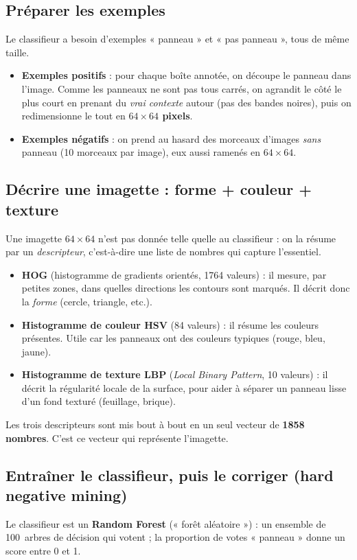 \documentclass[a4paper,10pt]{article}
\begin{document}
\subsection{Préparer les exemples}
Le classifieur a besoin d'exemples « panneau » et « pas panneau », tous de même
taille.
\begin{itemize}[noitemsep,topsep=2pt]
\item \textbf{Exemples positifs} : pour chaque boîte annotée, on découpe le panneau
dans l'image. Comme les panneaux ne sont pas tous carrés, on agrandit le côté le plus
court en prenant du \emph{vrai contexte} autour (pas des bandes noires), puis on
redimensionne le tout en \textbf{$64\times64$ pixels}.
\item \textbf{Exemples négatifs} : on prend au hasard des morceaux d'images
\emph{sans} panneau (10 morceaux par image), eux aussi ramenés en $64\times64$.
\end{itemize}

\subsection{Décrire une imagette : forme + couleur + texture}
Une imagette $64\times64$ n'est pas donnée telle quelle au classifieur : on la résume
par un \emph{descripteur}, c'est-à-dire une liste de nombres qui capture l'essentiel.
\begin{itemize}[noitemsep,topsep=2pt]
\item \textbf{HOG} (histogramme de gradients orientés, 1764 valeurs) : il mesure, par
petites zones, dans quelles directions les contours sont marqués. Il décrit donc la
\emph{forme} (cercle, triangle, etc.).
\item \textbf{Histogramme de couleur HSV} (84 valeurs) : il résume les couleurs
présentes. Utile car les panneaux ont des couleurs typiques (rouge, bleu, jaune).
\item \textbf{Histogramme de texture LBP} (\emph{Local Binary Pattern}, 10 valeurs) :
il décrit la régularité locale de la surface, pour aider à séparer un panneau lisse
d'un fond texturé (feuillage, brique).
\end{itemize}
Les trois descripteurs sont mis bout à bout en un seul vecteur de \textbf{1858
nombres}. C'est ce vecteur qui représente l'imagette.

\subsection{Entraîner le classifieur, puis le corriger (hard negative mining)}
Le classifieur est un \textbf{Random Forest} (« forêt aléatoire ») : un ensemble de
100~arbres de décision qui votent ; la proportion de votes « panneau » donne un score
entre 0 et 1.
\end{document}
